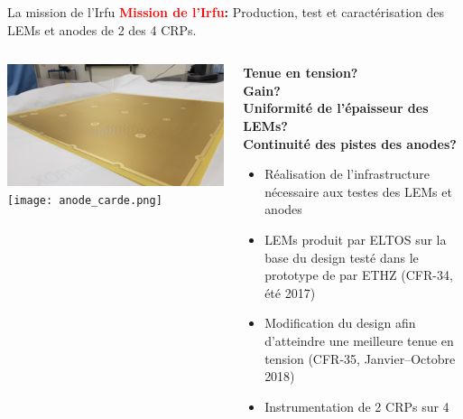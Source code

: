     \begin{frame}{La mission de l'Irfu}
        \centering \textbf{\textcolor{red}{Mission de l'Irfu}: }Production, test et caractérisation des LEMs et anodes de 2 des 4 CRPs.\\\vfill
    	\begin{scriptsize}
        	\begin{columns}
            	\begin{column}{0.5\textwidth}
                	\includegraphics[width=\textwidth]{./pictures/LEM.png}\\
                   	\texttt{[image: anode\_carde.png]}
            	\end{column}
       	        \begin{column}{0.5\textwidth}
           	        \textbf{Tenue en tension?\\
           	        Gain?\\
           	        Uniformité de l'épaisseur des LEMs?\\
           	        Continuité des pistes des anodes?\\}\vspace{0.3cm}
           	        \begin{itemize}
               	        \item Réalisation de l'infrastructure nécessaire aux testes des LEMs et anodes
               	        \item LEMs produit par ELTOS sur la base du design testé dans le prototype de \threeL{} par ETHZ (CFR-34, été 2017)
               	        \item Modification du design afin d'atteindre une meilleure tenue en tension (CFR-35, Janvier--Octobre 2018)
               	        \item Instrumentation de 2 CRPs sur 4
           	        \end{itemize}
       	        \end{column}
        	\end{columns}
   		\end{scriptsize}
    \end{frame}

